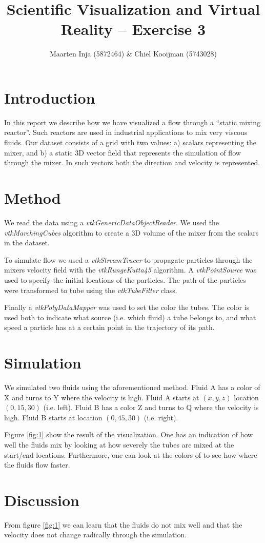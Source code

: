 \documentclass{article}[10pt]
\title{Scientific Visualization and Virtual Reality – Exercise 3}
\author{Maarten Inja (5872464) \& Chiel Kooijman (5743028)}
\begin{document}
\maketitle

\section{Introduction}
In this report we describe how we have visualized a flow through a ``static
mixing reactor''. Such reactors are used in industrial applications to mix very
viscous fluids. Our dataset consists of a grid with two values: a) scalars
representing the mixer, and b) a static 3D vector field that represents the
simulation of flow through the mixer. In such vectors both the direction and
velocity is represented.

\section{Method}
We read the data using a \emph{vtkGenericDataObjectReader}. We used the
\emph{vtkMarchingCubes} algorithm to create a 3D volume of the mixer from the
scalars in the dataset.

To simulate flow we used a \emph{vtkStreamTracer} to propagate particles through
the mixers velocity field with the \emph{vtkRungeKutta45} algorithm. A
\emph{vtkPointSource} was used to specify the initial locations of the particles.
The path of the particles were transformed to tube using the \emph{vtkTubeFilter}
class.

Finally a \emph{vtkPolyDataMapper} was used to set the color the tubes. The
color is used both to indicate what source (i.e. which fluid) a tube belongs to,
and what speed a particle has at a certain point in the trajectory of its path.

\section{Simulation}
We simulated two fluids using the aforementioned method. Fluid A has a color of
X and turns to Y where the velocity is high. Fluid A starts at $(x, y, z)$
location $(0, 15, 30)$ (i.e. left). Fluid B has a color Z and turns to Q where
the velocity is high. Fluid B starts at location $(0, 45, 30)$ (i.e. right).

Figure \ref{fig:1} show the result of the visualization. One has an indication
of how well the fluids mix by looking at how severely the tubes are mixed at the
start/end locations. Furthermore, one can look at the colors of to see how where
the fluids flow faster.

\section{Discussion}
From figure \ref{fig:1} we can learn that the fluids do not mix well and that
the velocity does not change radically through the simulation.


\end{document}
